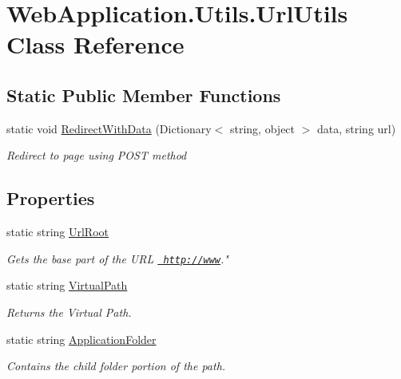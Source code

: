 \hypertarget{classWebApplication_1_1Utils_1_1UrlUtils}{}\section{Web\+Application.\+Utils.\+Url\+Utils Class Reference}
\label{classWebApplication_1_1Utils_1_1UrlUtils}
\subsection*{Static Public Member Functions}
\begin{DoxyCompactItemize}
\item 
static void \mbox{\hyperlink{classWebApplication_1_1Utils_1_1UrlUtils_a1de7db509a7a00d84a4f064107a224f0}{Redirect\+With\+Data}} (Dictionary$<$ string, object $>$ data, string url)
\begin{DoxyCompactList}\small\item\em Redirect to page using P\+O\+ST method \end{DoxyCompactList}\end{DoxyCompactItemize}
\subsection*{Properties}
\begin{DoxyCompactItemize}
\item 
static string \mbox{\hyperlink{classWebApplication_1_1Utils_1_1UrlUtils_adb71e72849d963175e4d427584e9c0e4}{Url\+Root}}
\begin{DoxyCompactList}\small\item\em Gets the base part of the U\+RL \textquotesingle{}\href{http://www}{\texttt{ http\+://www}}." \end{DoxyCompactList}\item 
static string \mbox{\hyperlink{classWebApplication_1_1Utils_1_1UrlUtils_ac5f6af06d5225617fed36065df2f3d25}{Virtual\+Path}}
\begin{DoxyCompactList}\small\item\em Returns the Virtual Path. \end{DoxyCompactList}\item 
static string \mbox{\hyperlink{classWebApplication_1_1Utils_1_1UrlUtils_ae9c551be3f6495bbcfedd6e2de4a596f}{Application\+Folder}}
\begin{DoxyCompactList}\small\item\em Contains the child folder portion of the path. \end{DoxyCompactList}\end{DoxyCompactItemize}



